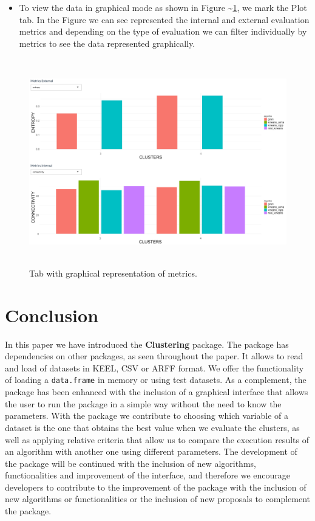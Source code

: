 \documentclass[
]{article}
\providecommand{\tightlist}{%
  \setlength{\itemsep}{0pt}\setlength{\parskip}{0pt}}
\begin{document}
\begin{itemize}
\tightlist
\item
  To view the data in graphical mode as shown in Figure
  \textasciitilde{}\ref{tab_graph}, we mark the Plot tab. In the Figure
  we can see represented the internal and external evaluation metrics
  and depending on the type of evaluation we can filter individually by
  metrics to see the data represented graphically.
\end{itemize}

\begin{figure}
\centering
\includegraphics[width=\textwidth,height=3.54167in]{img/tab_graph}
\caption{Tab with graphical representation of metrics.
\label{tab_graph}}
\end{figure}

\newpage

\hypertarget{conclusion}{%
\section{Conclusion}\label{conclusion}}

In this paper we have introduced the \textbf{Clustering} package. The
package has dependencies on other packages, as seen throughout the
paper. It allows to read and load of datasets in KEEL, CSV or ARFF
format. We offer the functionality of loading a \texttt{data.frame} in
memory or using test datasets. As a complement, the package has been
enhanced with the inclusion of a graphical interface that allows the
user to run the package in a simple way without the need to know the
parameters. With the package we contribute to choosing which variable of
a dataset is the one that obtains the best value when we evaluate the
clusters, as well as applying relative criteria that allow us to compare
the execution results of an algorithm with another one using different
parameters. The development of the package will be continued with the
inclusion of new algorithms, functionalities and improvement of the
interface, and therefore we encourage developers to contribute to the
improvement of the package with the inclusion of new algorithms or
functionalities or the inclusion of new proposals to complement the
package.
\end{document}
